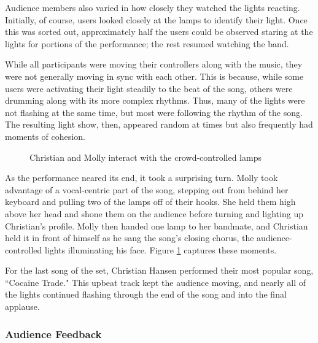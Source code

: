 Audience members also varied in how closely they watched the lights reacting. Initially, of course, users looked closely at the lamps to identify their light. Once this was sorted out, approximately half the users could be observed staring at the lights for portions of the performance; the rest resumed watching the band.

While all participants were moving their controllers along with the music, they were not generally moving in sync with each other. This is because, while some users were activating their light steadily to the beat of the song, others were drumming along with its more complex rhythms. Thus, many of the lights were not flashing at the same time, but most were following the rhythm of the song. The resulting light show, then, appeared random at times but also frequently had moments of cohesion.

\begin{figure}
	\centering

	\hspace{0.1cm}

	\caption{Christian and Molly interact with the crowd-controlled lamps}

	\label{prototyping3.12}
\end{figure}

As the performance neared its end, it took a surprising turn. Molly took advantage of a vocal-centric part of the song, stepping out from behind her keyboard and pulling two of the lamps off of their hooks. She held them high above her head and shone them on the audience before turning and lighting up Christian's profile. Molly then handed one lamp to her bandmate, and Christian held it in front of himself as he sang the song's closing chorus, the audience-controlled lights illuminating his face. Figure \ref{prototyping3.12} captures these moments.

For the last song of the set, Christian Hansen performed their most popular song, ``Cocaine Trade." This upbeat track kept the audience moving, and nearly all of the lights continued flashing through the end of the song and into the final applause.

\subsubsection{Audience Feedback}


